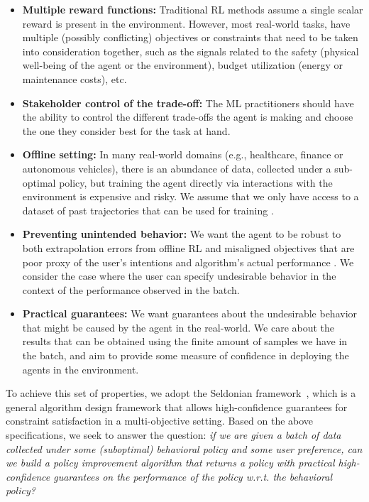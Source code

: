 \begin{itemize}[topsep=0pt, leftmargin=*]
    \item \textbf{Multiple reward functions:} Traditional RL methods assume a single scalar reward is present in the environment.
    However, most real-world tasks, have multiple (possibly conflicting) objectives or constraints that need to be taken into consideration together, such as the signals related to the safety (physical well-being of the agent or the environment), budget utilization (energy or maintenance costs), etc.
    
    \item \textbf{Stakeholder control of the trade-off:} 
    The ML practitioners should have the ability to control the different trade-offs the agent is making and choose the one they consider best for the task at hand. 
    
    \item \textbf{Offline setting:} 
    In many real-world domains (e.g., healthcare, finance or autonomous vehicles), there is an abundance of data, collected under a sub-optimal policy, but training the agent directly via interactions with the environment is expensive and risky.
    We assume that we only have access to a dataset of past trajectories that can be used for training \citep{lange2012batch}. 
    
    \item \textbf{Preventing unintended behavior:} We want the agent to be robust to 
    both extrapolation errors from offline RL and misaligned objectives that are poor proxy of the user's intentions and algorithm's actual performance \citep{ng1999policy, amodei2016concrete}.
    We consider the case where the user can specify undesirable behavior in the context of the performance observed in the batch. 
    
    \item \textbf{Practical guarantees:}
    We want guarantees about the undesirable behavior that might be caused by the agent in the real-world. We care about the results that can be obtained using the finite amount of samples we have in the batch, and aim to provide some measure of confidence in deploying the agents in the environment. 
\end{itemize}


To achieve this set of properties, we adopt the Seldonian framework~\citep{Thomas2019}, which is a general algorithm design framework that allows high-confidence guarantees for constraint satisfaction in a multi-objective setting. 
Based on the above specifications, we seek to answer the question:
\textit{if we are given a batch of data collected under some (suboptimal) behavioral policy and some user preference, can we build a policy improvement algorithm that returns a policy with practical high-confidence guarantees on the performance of the policy w.r.t. the behavioral policy?}

